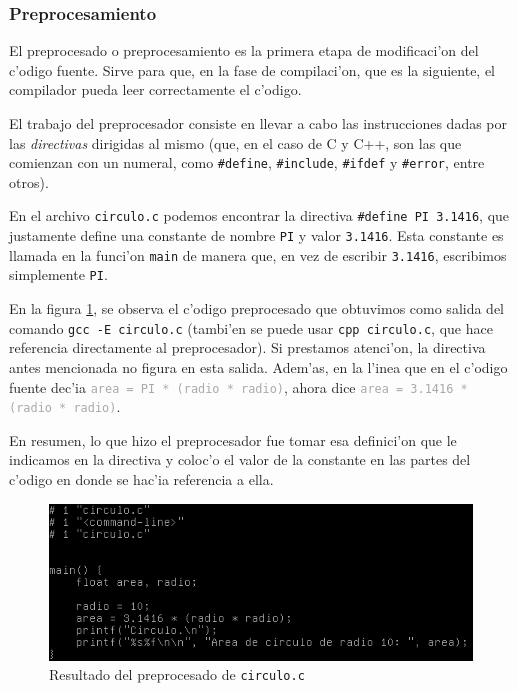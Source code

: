 \documentclass[11pt]{article}
\begin{document}
	\subsubsection{Preprocesamiento}
		El preprocesado o preprocesamiento es la primera etapa de modificaci'on del c'odigo fuente. Sirve para que, en la fase de compilaci'on, que es la siguiente, el compilador pueda leer correctamente el c'odigo. 
    
    	El trabajo del preprocesador consiste en llevar a cabo las instrucciones dadas por las \textit{directivas} dirigidas al mismo (que, en el caso de C y C++, son las que comienzan con un numeral, como \texttt{\textcolor{fuchsia-vim}{\#define}}, \texttt{\textcolor{fuchsia-vim}{\#include}}, \texttt{\textcolor{fuchsia-vim}{\#ifdef}} y \texttt{\textcolor{fuchsia-vim}{\#error}}, entre otros).

   		En el archivo \texttt{circulo.c} podemos encontrar la directiva  \texttt{\textcolor{fuchsia-vim}{\#define PI} \textcolor{orange-desert-vim}{3.1416}}, que justamente define una constante de nombre \texttt{\textcolor{fuchsia-vim}{PI}} y valor \texttt{\textcolor{orange-desert-vim}{3.1416}}. Esta constante es llamada en la funci'on \texttt{main} de manera que, en vez de escribir  \texttt{\textcolor{orange-desert-vim}{3.1416}}, escribimos simplemente  \texttt{\textcolor{fuchsia-vim}{PI}}.

    	En la figura \ref{fig:preproc_circ},
   		se observa el c'odigo preprocesado que obtuvimos como salida del comando \texttt{gcc -E circulo.c} (tambi'en se puede usar \texttt{cpp circulo.c}, que hace referencia directamente al preprocesador). Si prestamos atenci'on, la directiva antes mencionada no figura en esta salida. Adem'as, en la l'inea que en el c'odigo fuente dec'ia \texttt{\textcolor{darkgray}{area = PI * (radio * radio)}}, ahora dice \texttt{\textcolor{darkgray}{area = \textcolor{orange-desert-vim}{3.1416} * (radio * radio)}}. 

   		En resumen, lo que hizo el preprocesador fue tomar esa definici'on que le indicamos en la directiva y coloc'o el valor de la constante en las partes del c'odigo en donde se hac'ia referencia a ella.
   		
   		\begin{figure}[H]
   			\centering
			\includegraphics[width=.9\linewidth]{Images/Seccion 1/preprocesado_circulo}
   			\caption{Resultado del preprocesado de \texttt{circulo.c}}
   			\label{fig:preproc_circ}
   		\end{figure}
\end{document}
